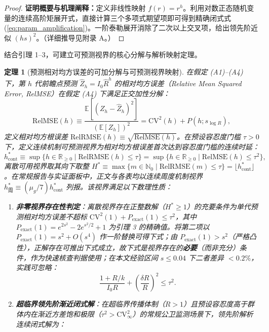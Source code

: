 \documentclass[11pt,a4paper]{article}
\theoremstyle{plain}
\newtheorem{theorem}{定理}
\theoremstyle{definition}
\begin{document}
\begin{proof}
\textbf{证明概要与机理阐释：}定义非线性映射 $f(r) = r^h$。利用对数正态随机变量的连续高阶矩展开式，直接计算三个多项式期望项即可得到精确闭式式 (\ref{eq:param_amplification})。一阶泰勒展开消除了二次以上交叉项，给出领先阶近似 $(hs)^2$。（详细推导见附录 A。）
\end{proof}

结合引理 1--3，可建立可预测视界的核心分解与解析映射定理。

\begin{theorem}[预测相对均方误差的可加分解与可预测视界映射]\label{thm:horizon}
在假定 (A1)--(A4) 下，第 $h$ 代前瞻点预测 $\hat{Z}_h = I_0 \hat{R}^h$ 的相对均方误差（Relative Mean Squared Error, RelMSE）在假定 (A4) 下满足正交加性分解：
\begin{equation}
\text{RelMSE}(h) \equiv \frac{\mathbb{E}[(Z_h - \hat{Z}_h)^2]}{(\mathbb{E}[Z_h])^2} = \text{CV}^2(h) + P(h; s_{\log R}),
\label{eq:relmse_decomp}
\end{equation}
定义相对均方根误差 $\text{RelRMSE}(h) \equiv \sqrt{\text{RelMSE}(h)}$。在预设容忍度门槛 $\tau > 0$ 下，定义连续机制可预测视界为相对均方根误差首次达到容忍度门槛的连续时延：
\begin{equation}
h^*_{\text{cont}} \equiv \sup\{h \in \mathbb{R}_{\ge 0} \mid \text{RelRMSE}(h) \le \tau\} = \sup\{h \in \mathbb{R}_{\ge 0} \mid \text{RelMSE}(h) \le \tau^2\},
\end{equation}
离散可用视界取其向下取整 $H^* \equiv \max\{m \in \mathbb{N}_0 \mid \text{RelRMSE}(m) \le \tau\} = \lfloor h^*_{\text{cont}} \rfloor$。在常规报告与实证面板中，正文与各表均以连续周度机制视界 $h^*_{\text{周}} \equiv (\mu_g/7) h^*_{\text{cont}}$ 列报。该视界满足以下数理性质：
\begin{enumerate}
\item \textbf{非零视界存在性判定}：离散视界存在正整数解（$H^* \ge 1$）的充要条件为单代预测相对均方误差不超标 $\text{CV}^2(1) + P_{\text{exact}}(1) \le \tau^2$，其中 $P_{\text{exact}}(1) = e^{2s^2} - 2e^{s^2/2} + 1$ 为引理 3 的精确值。将第二项以 $P_{\text{exact}}(1) = s^2 + O(s^4)$ 作一阶替换可得下式；由 $P_{\text{exact}}(1) > s^2$（严格凸性），正解存在可推出下式成立，故下式是视界存在的\textbf{必要}（而非充分）条件，作为快速核查判据使用；在本文经验区间 $s \le 0.04$ 下二者差异 $<0.2\%$，实践可忽略：
\begin{equation}
\frac{1 + R/k}{I_0 R} + \left(\frac{\delta R}{R}\right)^2 \le \tau^2.
\label{eq:h_exist_cond}
\end{equation}
\item \textbf{超临界领先阶渐近闭式解}：在超临界传播体制（$R > 1$）且预设容忍度高于群体内在渐近方差饱和极限（$\tau^2 > \text{CV}^2_\infty$）的常规公卫监测场景下，领先阶解析连续闭式解为：

\end{enumerate}
\end{theorem}
\end{document}
